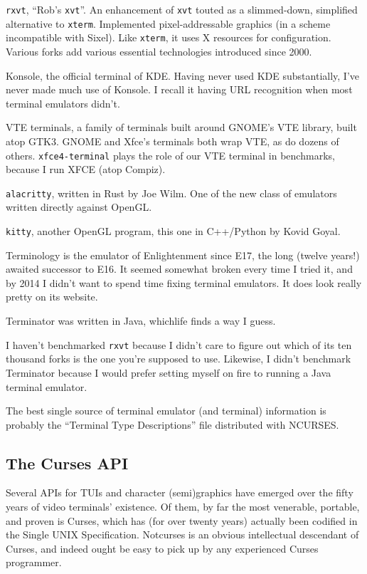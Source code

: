 \begin{denseitemize}
\item{\texttt{rxvt}, ``Rob's \texttt{xvt}''. An enhancement of \texttt{xvt} touted
    as a slimmed-down, simplified alternative to \texttt{xterm}. Implemented pixel-addressable
    graphics (in a scheme incompatible with Sixel). Like \texttt{xterm}, it uses
    X resources for configuration. Various forks add various essential technologies
    introduced since 2000.}
\item{Konsole, the official terminal of KDE. Having never used KDE substantially,
   I've never made much use of Konsole. I recall it having URL recognition
   when most terminal emulators didn't.}
\item{VTE terminals, a family of terminals built around GNOME's VTE library, built
  atop GTK3. GNOME and Xfce's terminals both wrap VTE, as do dozens of others.
  \texttt{xfce4-terminal} plays the role of our VTE terminal in benchmarks, because
  I run XFCE (atop Compiz).}
\item{\texttt{alacritty}, written in Rust by Joe Wilm. One of the new class of
    emulators written directly against OpenGL.}
\item{\texttt{kitty}, another OpenGL program, this one in C++/Python by Kovid Goyal.}
\item{Terminology is the emulator of Enlightenment since E17, the long (twelve
    years!) awaited successor to E16. It seemed somewhat broken every time I
    tried it, and by 2014 I didn't want to spend time fixing terminal emulators.
    It does look really pretty on its website\cite{terminology}.}
\item{Terminator was written in Java, which\textellipsis life finds a way I guess.}
\end{denseitemize}

I haven't benchmarked \texttt{rxvt} because I didn't care to figure out which of
its ten thousand forks is the one you're supposed to use. Likewise, I didn't
benchmark Terminator because I would prefer setting myself on fire
to running a Java terminal emulator.

The best single source of terminal emulator (and terminal) information is
probably the ``Terminal Type Descriptions'' file distributed with NCURSES\cite{termdescript}.

\subsection{The Curses API}
Several APIs for TUIs and character (semi)graphics have emerged over the fifty
years of video terminals' existence. Of them, by far the most venerable,
portable, and proven is Curses, which has (for over twenty years) actually
been codified in the Single UNIX Specification. Notcurses is an obvious
intellectual descendant of Curses, and indeed ought be easy to pick up by any
experienced Curses programmer.

